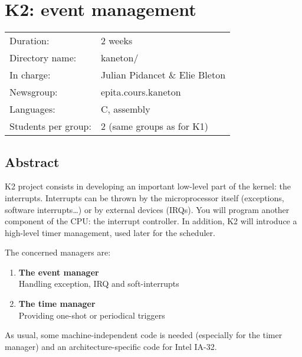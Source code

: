 
%
%

\chapter{K2: event management}

%
%

\begin{tabular}{p{7cm}l}
Duration: & 2 weeks \\
Directory name: & kaneton/ \\
In charge: & Julian Pidancet \& Elie Bleton\\
Newsgroup: & epita.cours.kaneton\\
Languages: & C, assembly \\
Students per group: & 2 (same groups as for K1) \\
\end{tabular}

\section{Abstract}

K2 project consists in developing an important low-level part of the
kernel: the interrupts. Interrupts can be thrown by the microprocessor
itself (exceptions, software interrupts\ldots) or by external devices
(IRQs). You will program another component of the CPU: the interrupt
controller. In addition, K2 will introduce a high-level timer
management, used later for the scheduler.

The concerned managers are:

\begin{enumerate}
  \item
    {\bf The event manager}\\
    Handling exception, IRQ and soft-interrupts
  \item
    {\bf The time manager}\\
    Providing one-shot or periodical triggers
\end{enumerate}

As usual, some machine-independent code is needed (especially for the
timer manager) and an architecture-specific code for Intel IA-32.

